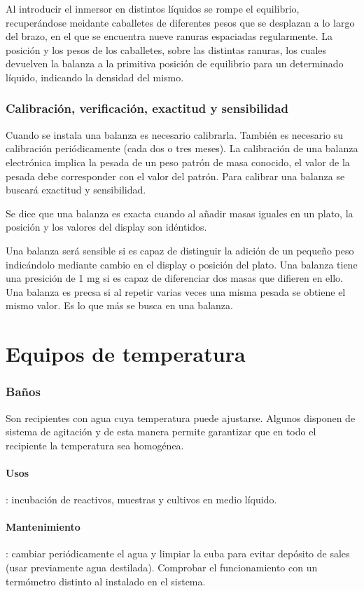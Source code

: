 Al introducir el inmersor en distintos líquidos se rompe el equilibrio, recuperándose meidante caballetes de diferentes pesos que se desplazan a lo largo del brazo, en el que se encuentra nueve ranuras espaciadas regularmente. La posición y los pesos de los caballetes, sobre las distintas ranuras, los cuales devuelven la balanza a la primitiva posición de equilibrio para un determinado líquido, indicando la densidad del mismo.
\subsubsection{Calibración, verificación, exactitud y sensibilidad}
Cuando se instala una balanza es necesario calibrarla. También es necesario su calibración periódicamente (cada dos o tres meses). La calibración de una balanza electrónica implica la pesada de un peso patrón de masa conocido, el valor de la pesada debe corresponder con el valor del patrón. Para calibrar una balanza se buscará exactitud y sensibilidad.

Se dice que una balanza es exacta cuando al añadir masas iguales en un plato, la posición y los valores del display son idéntidos.

Una balanza será sensible si es capaz de distinguir la adición de un pequeño peso  indicándolo mediante cambio en el display o posición del plato. Una balanza tiene una presición de 1 mg si es capaz de diferenciar dos masas que difieren en ello. Una balanza es precsa si al repetir varias veces una misma pesada se obtiene el mismo valor. Es lo que más se busca en una balanza.
\section{Equipos de temperatura}
\subsubsection{Baños}
Son recipientes con agua cuya temperatura puede ajustarse. Algunos disponen de sistema de agitación y de esta manera permite garantizar que en todo el recipiente la temperatura sea homogénea.
\paragraph{Usos}: incubación de reactivos, muestras y cultivos en medio líquido.
\paragraph{Mantenimiento}: cambiar periódicamente el agua y limpiar la cuba para evitar depósito de sales (usar previamente agua destilada). Comprobar el funcionamiento con un termómetro distinto al instalado en el sistema.
